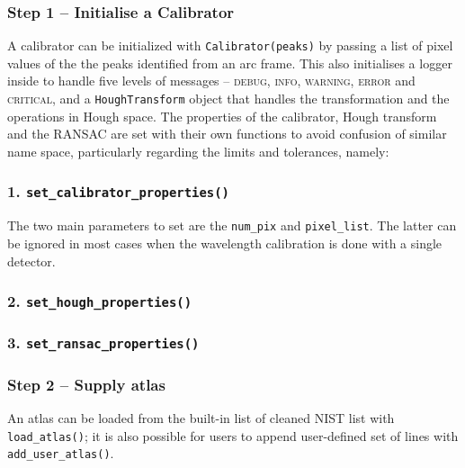 \documentclass{aa}
\begin{document}
\subsubsection*{Step 1 -- Initialise a Calibrator}
A calibrator can be initialized with \texttt{Calibrator(peaks)} by passing a list of
pixel values of the the peaks identified from an arc frame. This also initialises a
logger inside to handle five levels of messages -- \textsc{debug}, \textsc{info},
\textsc{warning}, \textsc{error} and \textsc{critical}, and a \texttt{HoughTransform}
object that handles the transformation and the operations in Hough space. The
properties of the calibrator, Hough transform and the RANSAC are set with their
own functions to avoid confusion of similar name space, particularly regarding the
limits and tolerances, namely:

\subsubsection*{1. \texttt{set\_calibrator\_properties()}}
The two main parameters to set are the \texttt{num\_pix} and \texttt{pixel\_list}. The
latter can be ignored in most cases when the wavelength calibration is done with a
single detector. 

\subsubsection*{2. \texttt{set\_hough\_properties()}}


\subsubsection*{3. \texttt{set\_ransac\_properties()}}


\subsubsection*{Step 2 -- Supply atlas}
An atlas can be loaded from the built-in list of cleaned NIST list with
\texttt{load\_atlas()}; it is also possible for users to append user-defined set
of lines with \texttt{add\_user\_atlas()}.
\end{document}
